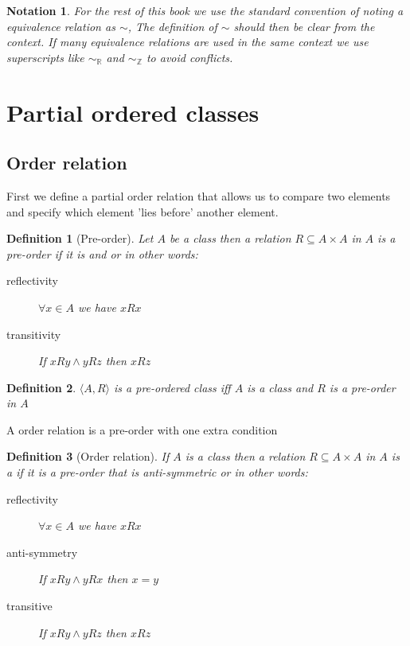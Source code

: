 \documentclass{book}
\newcommand{\tmtextbf}[1]{\text{{\bfseries{#1}}}}
\newtheorem{definition}{Definition}
{\theorembodyfont{\rmfamily}\newtheorem{example}{Example}}
\newtheorem{notation}{Notation}
{\theorembodyfont{\rmfamily}\newtheorem{note}{Note}}
\begin{document}
\begin{notation}
  For the rest of this book we use the standard convention of noting a
  equivalence relation as $\sim$, The definition of $\sim$ should then be
  clear from the context. If many equivalence relations are used in the same
  context we use superscripts like $\sim_{\mathbb{R}}$ and $\sim_{\mathbb{Z}}$
  to avoid conflicts.
\end{notation}

\section{Partial ordered classes}

\subsection{Order relation}

First we define a partial order relation that allows us to compare two
elements and specify which element 'lies before' another element. \

\begin{definition}[Pre-order]
  \label{order preorder}{}Let $A$ be a class then a relation
  $R \subseteq A \times A$ in $A$ is a pre-order if it is \tmtextbf{reflexive}
  and \tmtextbf{transitive} or in other words:
  \begin{description}
    \item[reflectivity] $\forall x \in A$ we have $x R x$
    
    \item[transitivity] If $x R y \wedge y R z$ then $x R z$
  \end{description}
\end{definition}

\begin{definition}
  \label{order preordered class}{}$\langle A, R
  \rangle$ is a pre-ordered class iff $A$ is a class and $R$ is a pre-order in
  $A$
\end{definition}

A order relation is a pre-order with one extra condition

\begin{definition}[Order relation]
  \label{order order relation}{}If $A$ is a class then a
  relation $R \subseteq A \times A$ in $A$ is a \tmtextbf{order} if it is a
  pre-order that is anti-symmetric or in other words:
  \begin{description}
    \item[reflectivity] $\forall x \in A$ we have $x R x$
    
    \item[anti-symmetry] If $x R y \wedge y R x$ then $x = y$
    
    \item[transitive] If $x R y \wedge y R z$ then $x R z$
  \end{description}
\end{definition}
\end{document}
